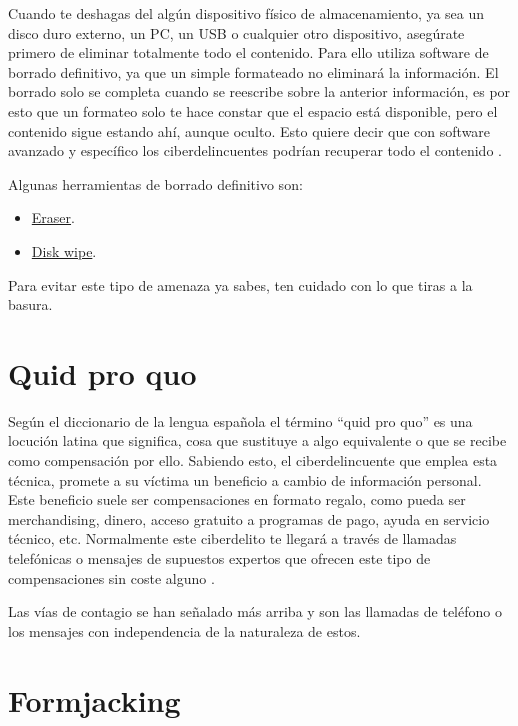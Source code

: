 \documentclass[
  spanish,
  a4paper,
  openany]{book}
\begin{document}
Cuando te deshagas del algún dispositivo físico de almacenamiento, ya sea un disco duro externo, un PC, un USB o cualquier otro dispositivo, asegúrate primero de eliminar totalmente todo el contenido. Para ello utiliza software de borrado definitivo, ya que un simple formateado no eliminará la información. El borrado solo se completa cuando se reescribe sobre la anterior información, es por esto que un formateo solo te hace constar que el espacio está disponible, pero el contenido sigue estando ahí, aunque oculto. Esto quiere decir que con software avanzado y específico los ciberdelincuentes podrían recuperar todo el contenido \citep{XATAKA-borrado-almacenamiento}.

Algunas herramientas de borrado definitivo son:

\begin{itemize}
\item
  \href{https://eraser.heidi.ie/}{Eraser}.
\item
  \href{https://www.diskwipe.org/download.php}{Disk wipe}.
\end{itemize}

Para evitar este tipo de amenaza ya sabes, ten cuidado con lo que tiras a la basura.

\hypertarget{quid-pro-quo}{%
\section{Quid pro quo}\label{quid-pro-quo}}

Según el diccionario de la lengua española el término ``quid pro quo'' es una locución latina que significa, cosa que sustituye a algo equivalente o que se recibe como compensación por ello. Sabiendo esto, el ciberdelincuente que emplea esta técnica, promete a su víctima un beneficio a cambio de información personal. Este beneficio suele ser compensaciones en formato regalo, como pueda ser merchandising, dinero, acceso gratuito a programas de pago, ayuda en servicio técnico, etc. Normalmente este ciberdelito te llegará a través de llamadas telefónicas o mensajes de supuestos expertos que ofrecen este tipo de compensaciones sin coste alguno \citep{quid-pro-quo}.

Las vías de contagio se han señalado más arriba y son las llamadas de teléfono o los mensajes con independencia de la naturaleza de estos.

\hypertarget{formjacking}{%
\section{Formjacking}\label{formjacking}}
\end{document}
